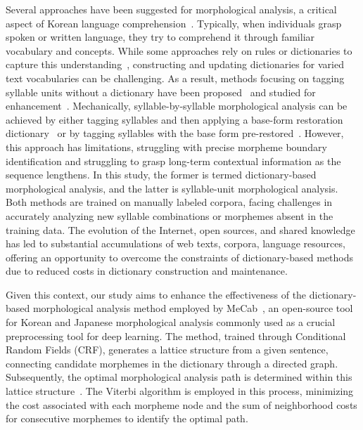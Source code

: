 \documentclass[AMS,STIX2COL]{WileyNJD-v2}
\begin{document}
    Several approaches have been suggested for morphological analysis, a critical aspect of Korean language comprehension~\cite{KwonHC1991, LeeDG2009, ShimKS2011, LeeJS2011, ShinJC2012, LeeCK2013, NaSH2014, NaSH2015, HwangHS2016, KimHM2016, ChungES2016, LeeCH2016, Li2017, NaSH2018, KimSW2018, ChoiYS2018, MinJW2018, MinJW2019, KimHM2019, SongHJ2019, MinJW2020, SongHJ2020, ChoiYS2020, HwangHS2020, KimHJ2021, YounJY2021, MinJW2022, KimJM2022, ShinHJ2023}.
    Typically, when individuals grasp spoken or written language, they try to comprehend it through familiar vocabulary and concepts.
    While some approaches rely on rules or dictionaries to capture this understanding~\cite{KwonHC1991}, constructing and updating dictionaries for varied text vocabularies can be challenging.
    As a result, methods focusing on tagging syllable units without a dictionary have been proposed~\cite{ShimKS2011, LeeCK2013, LeeCH2016, KimHM2016} and studied for enhancement~\cite{KimSW2018, ChoiYS2018, KimHM2019, MinJW2019, SongHJ2019, SongHJ2020, YounJY2021, ShinHJ2023}.
    Mechanically, syllable-by-syllable morphological analysis can be achieved by either tagging syllables and then applying a base-form restoration dictionary~\cite{ShimKS2011, LeeCH2016} or by tagging syllables with the base form pre-restored~\cite{YounJY2021}.
    However, this approach has limitations, struggling with precise morpheme boundary identification and struggling to grasp long-term contextual information as the sequence lengthens.
    In this study, the former is termed dictionary-based morphological analysis, and the latter is syllable-unit morphological analysis.
    Both methods are trained on manually labeled corpora, facing challenges in accurately analyzing new syllable combinations or morphemes absent in the training data.
    The evolution of the Internet, open sources, and shared knowledge has led to substantial accumulations of web texts, corpora, language resources, offering an opportunity to overcome the constraints of dictionary-based methods due to reduced costs in dictionary construction and maintenance.

    Given this context, our study aims to enhance the effectiveness of the dictionary-based morphological analysis method employed by MeCab~\cite{MeCab}, an open-source tool for Korean and Japanese morphological analysis commonly used as a crucial preprocessing tool for deep learning.
    The method, trained through Conditional Random Fields (CRF), generates a lattice structure from a given sentence, connecting candidate morphemes in the dictionary through a directed graph.
    Subsequently, the optimal morphological analysis path is determined within this lattice structure~\cite{Kudo2004, NaSH2014, NaSH2018}.
    The Viterbi algorithm is employed in this process, minimizing the cost associated with each morpheme node and the sum of neighborhood costs for consecutive morphemes to identify the optimal path.
\end{document}
